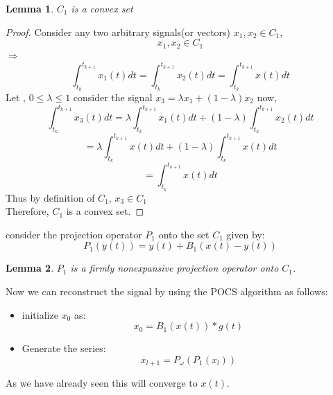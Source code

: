 \documentclass{article}
\newtheorem{lemma}{Lemma}[section]
\begin{document}
\begin{lemma}
$C_1$ is a convex set
\end{lemma}
\begin{proof}
Consider any two arbitrary signals(or vectors) $x_1,x_2 \in C_{1}$, 
\begin{equation*}
    x_1,x_2 \in C_{1}
\end{equation*}
$\Rightarrow$
\[
    \int_{t_k}^{t_{k+1}}x_1(t)dt = \int_{t_k}^{t_{k+1}}x_2(t)dt = \int_{t_k}^{t_{k+1}}x(t)dt
\]
Let , $0 \leq \lambda \leq 1$
consider the signal $x_3 = \lambda x_1 + (1-\lambda) x_2 $
now,
\[
    \int_{t_k}^{t_{k+1}}x_3(t)dt = \lambda\int_{t_k}^{t_{k+1}}x_1(t)dt + (1-\lambda)\int_{t_k}^{t_{k+1}}x_2(t)dt
\]
\[
    = \lambda\int_{t_k}^{t_{k+1}}x(t)dt + (1-\lambda)\int_{t_k}^{t_{k+1}}x(t)dt 
\]
\[
    = \int_{t_k}^{t_{k+1}}x(t)dt
\]
Thus by definition of $C_1$, $x_3 \in C_1$\\
Therefore, $C_1$ is a convex set.
\end{proof}

consider the projection operator $P_1$ onto the set $C_1$ given by:
\begin{equation}
    P_{1}(y(t)) = y(t) + B_1(x(t)-y(t))
\end{equation}

\begin{lemma}
$P_1$ is a firmly nonexpansive projection operator onto $C_1$.
\end{lemma}


Now we can reconstruct the signal by using the POCS algorithm as follows:
\begin{itemize}
    \item initialize $x_0$ as:
    \begin{equation}
        x_0 = B_1(x(t))*g(t) 
    \end{equation}
    \item Generate the series:
    \begin{equation}
        x_{l+1} = P_{\omega}(P_{1}(x_l))
    \end{equation}
\end{itemize}
As we have already seen this will converge to $x(t)$.
\end{document}
